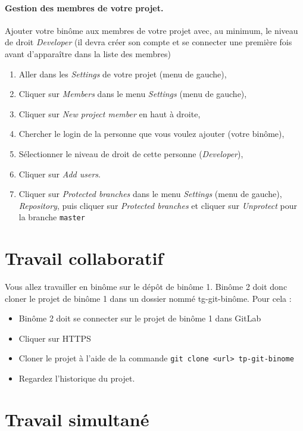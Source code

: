 \documentclass[final, a4paper, openbib, ]{article}
\begin{document}
\paragraph{Gestion des membres de votre projet.}
Ajouter votre binôme aux membres de votre projet avec, au minimum, le niveau de droit \textit{Developer} (il devra créer son compte et se connecter une première fois avant d'apparaître dans la liste des membres)
\begin{enumerate}
\item Aller dans les \textit{Settings} de votre projet (menu de gauche),
\item Cliquer sur \textit{Members} dans le menu \textit{Settings} (menu de gauche),
\item Cliquer sur \textit{New project member} en haut à droite,
\item Chercher le login de la personne que vous voulez ajouter (votre binôme),
\item Sélectionner le niveau de droit de cette personne (\textit{Developer}),
\item Cliquer sur \textit{Add users}.
\item Cliquer sur \textit{Protected branches} dans le menu \textit{Settings} (menu de gauche), \textit{Repository},
puis cliquer sur \textit{Protected branches} et cliquer sur \textit{Unprotect} pour la branche \texttt{master}
\end{enumerate}


\section{Travail collaboratif}


Vous allez travailler en binôme sur le dépôt de binôme 1. 
Binôme 2 doit donc cloner le projet de binôme 1 dans un dossier nommé tg-git-binôme.
Pour cela :
\begin{itemize}
\item Binôme 2 doit se connecter sur le projet de binôme 1 dans GitLab %
\item Cliquer sur HTTPS
\item Cloner le projet à l'aide de la commande \texttt{git clone <url> tp-git-binome}
\item Regardez l'historique du projet.
\end{itemize}

\section{Travail simultané}
\end{document}
